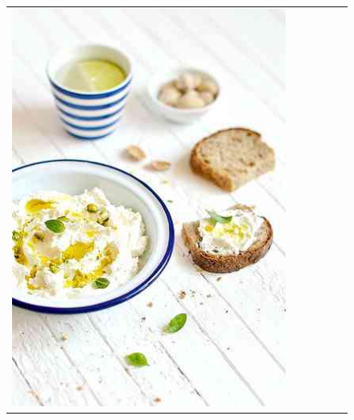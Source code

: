 \begin{figure}
\begin{tabular}{m{.01\linewidth} m{.16\linewidth} m{.16\linewidth} m{.16\linewidth} m{.16\linewidth} m{.16\linewidth}}
    \includegraphics[width=\linewidth]{../style/figures/flickr_on_flickr/pred_style_Romantic/3.jpg} &

\end{tabular}
\end{figure}
